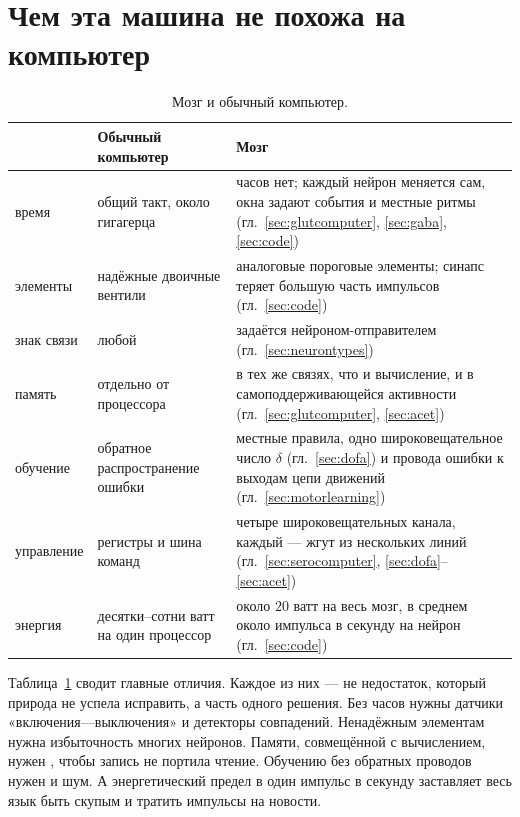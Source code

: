 \section{Чем эта машина не похожа на компьютер}

\begin{table}[t]
\centering
\footnotesize
\setlength{\tabcolsep}{4pt}
\renewcommand{\arraystretch}{1.15}
\begin{tabular}{>{\raggedright}p{2.2cm}>{\raggedright}p{4.2cm}>{\raggedright\arraybackslash}p{6.6cm}}
\toprule
& Обычный компьютер & Мозг \\
\midrule
время & общий такт, около гигагерца & часов нет; каждый нейрон меняется сам, окна задают события и местные ритмы (гл.~\ref{sec:glutcomputer}, \ref{sec:gaba}, \ref{sec:code}) \\
элементы & надёжные двоичные вентили & аналоговые пороговые элементы; синапс теряет большую часть импульсов (гл.~\ref{sec:code}) \\
знак связи & любой & задаётся нейроном-отправителем (гл.~\ref{sec:neurontypes}) \\
память & отдельно от процессора & в тех же связях, что и вычисление, и в самоподдерживающейся активности (гл.~\ref{sec:glutcomputer}, \ref{sec:acet}) \\
обучение & обратное распространение ошибки & местные правила, одно широковещательное число $\delta$ (гл.~\ref{sec:dofa}) и провода ошибки к выходам цепи движений (гл.~\ref{sec:motorlearning}) \\
управление & регистры и шина команд & четыре широковещательных канала, каждый --- жгут из нескольких линий (гл.~\ref{sec:serocomputer}, \ref{sec:dofa}--\ref{sec:acet}) \\
энергия & десятки--сотни ватт на один процессор & около $20$ ватт на весь мозг, в среднем около импульса в секунду на нейрон (гл.~\ref{sec:code}) \\
\bottomrule
\end{tabular}
\caption{Мозг и обычный компьютер.}
\label{tab:computer}
\end{table}

Таблица~\ref{tab:computer} сводит главные отличия. Каждое из них --- не недостаток, который природа не успела исправить, а часть одного решения. Без часов нужны датчики «включения---выключения» и детекторы совпадений. Ненадёжным элементам нужна избыточность многих нейронов. Памяти, совмещённой с вычислением, нужен , чтобы запись не портила чтение. Обучению без обратных проводов нужен  и шум. А энергетический предел в один импульс в секунду заставляет весь язык быть скупым и тратить импульсы на новости.

